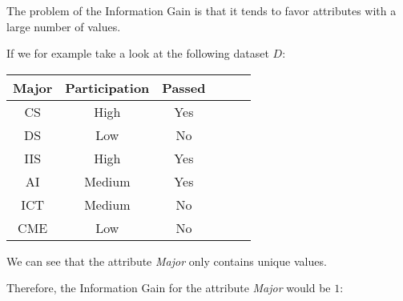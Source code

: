\documentclass[
english,
smallborders
]{i6prcsht}
\begin{document}
\begin{solution}
	The problem of the Information Gain is that it tends to favor attributes with a large number of values.

	If we for example take a look at the following dataset $D$:

	\begin{center}
		\begin{tabular}{|c|c|c|c|c|c|}
			\hline
			\textbf{Major} & \textbf{Participation} & \textbf{Passed} \\ \hline
			CS             & High                   & Yes             \\ \hline
			DS             & Low                    & No              \\ \hline
			IIS            & High                   & Yes             \\ \hline
			AI             & Medium                 & Yes             \\ \hline
			ICT            & Medium                 & No              \\ \hline
			CME            & Low                    & No              \\ \hline
		\end{tabular}
	\end{center}

	We can see that the attribute \textit{Major} only contains unique values.

	Therefore, the Information Gain for the attribute \textit{Major} would be $1$:


\end{solution}
\end{document}
